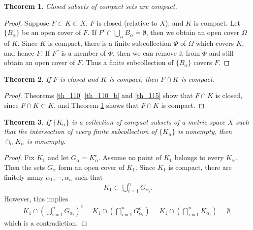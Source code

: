 \documentclass[10pt]{book}
\newtheorem{theorem}{Theorem}[chapter]
\theoremstyle{definition}
\numberwithin{equation}{chapter}
\begin{document}
\medskip

\begin{theorem}\label{th_116}
Closed subsets of compact sets are compact.
\end{theorem}
\begin{proof}
Suppose $F \subset K \subset X$, $F$ is closed (relative to $X$), and $K$ is compact. Let $\{B_{\alpha}\}$ be an open cover of $F$. If $F^c \cap \bigcup_{\alpha}B_{\alpha} = \emptyset$, then we obtain an open cover $\Omega$ of $K$. Since $K$ is compact, there is a finite subcollection $\Phi$ of $\Omega$ which covers $K$, and hence $F$. If $F^c$ is a member of $\Phi$, then we can remove it from $\Phi$ and still obtain an open cover of $F$. Thus a finite subcollection of $\{B_{\alpha}\}$ covers $F$.
\end{proof}

\medskip

\begin{theorem}
If $F$ is closed and $K$ is compact, then $F \cap K$ is compact.
\end{theorem}
\begin{proof}
Theorems \ref{th_110} \ref{th_110_b} and \ref{th_115} show that $F \cap K$ is closed, since $F \cap K \subset K$, and Theorem \ref{th_116} shows that $F \cap K$ is compact.
\end{proof}

\medskip

\begin{theorem}\label{th_118}
If $\{K_{\alpha}\}$ is a collection of compact subsets of a metric space $X$ such that the intersection of every finite subcollection of $\{K_{\alpha}\}$ is nonempty, then $\cap_{\alpha} K_{\alpha}$ is nonempty.
\end{theorem}
\begin{proof}
Fix $K_1$ and let $G_{\alpha} = K_{\alpha}^c$. Assume no point of $K_1$ belongs to every $K_{\alpha}$. Then the sets $G_{\alpha}$ form an open cover of $K_1$. Since $K_1$ is compact, there are finitely many $\alpha_1, \cdots, \alpha_n$ such that
\begin{align*}
    K_1 \subset \bigcup^n_{i=1} G_{\alpha_i}.
\end{align*}
However, this implies
\begin{align*}
    K_1 \cap \left(\bigcup^n_{i=1} G_{\alpha_i}\right)^c = K_1 \cap \left(\bigcap^n_{i=1} G_{\alpha_i}^c\right) = K_1 \cap \left(\bigcap^n_{i=1} K_{\alpha_i}\right) = \emptyset,
\end{align*}
which is a contradiction.
\end{proof}
\end{document}
